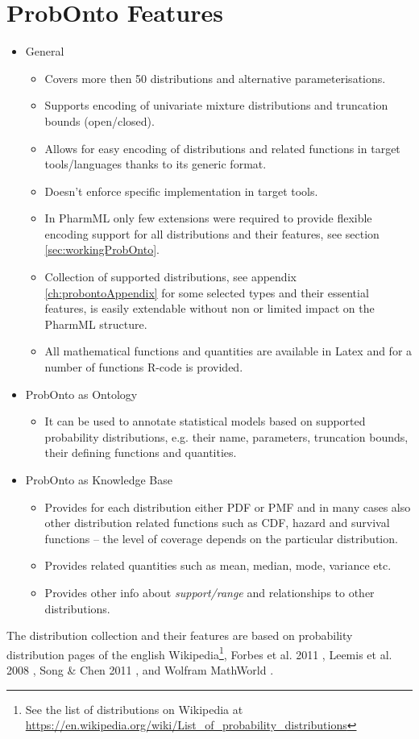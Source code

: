 \section{ProbOnto Features}
\begin{itemize}
\item
General 
\begin{itemize}
\item
Covers more then 50 distributions and alternative parameterisations.
\item
Supports encoding of univariate mixture distributions and truncation bounds (open/closed).
\item
Allows for easy encoding of distributions and related functions in target 
tools/languages thanks to its generic format.
\item
Doesn't enforce specific implementation in target tools.
\item
In PharmML only few extensions were required to provide flexible encoding support
for all distributions and their features, see section \ref{sec:workingProbOnto}.
\item
Collection of supported distributions, see appendix \ref{ch:probontoAppendix} for 
some selected types and their essential features, is easily extendable 
without non or limited impact on the PharmML structure.
\item
All mathematical functions and quantities are available in Latex and  for a number 
of functions R-code is provided.
\end{itemize}
\item
ProbOnto as Ontology
\begin{itemize}
\item
It can be used to annotate statistical models based on supported probability 
distributions, e.g. their name, parameters, truncation bounds, their defining 
functions and quantities.
\end{itemize}
\item
ProbOnto as Knowledge Base
\begin{itemize}
\item
Provides for each distribution either PDF or PMF and in many cases also 
other distribution related functions such as CDF, hazard and survival functions 
-- the level of coverage depends on the particular distribution. 
\item
Provides related quantities such as mean, median, mode, variance etc.
\item
Provides other info about \emph{support/range} and relationships to other distributions.
\end{itemize}
\end{itemize}
The distribution collection and their features are based on
probability distribution pages of the english Wikipedia\footnote{See the list of 
distributions on Wikipedia at \url{https://en.wikipedia.org/wiki/List_of_probability_distributions}}, 
Forbes et al. 2011 \cite{forbes2011statistical}, Leemis et al. 2008 \cite{Leemis:2008tg}, 
Song \& Chen 2011 \cite{song2011eighty}, and 
Wolfram MathWorld \cite{weisstein2007wolfram}.

